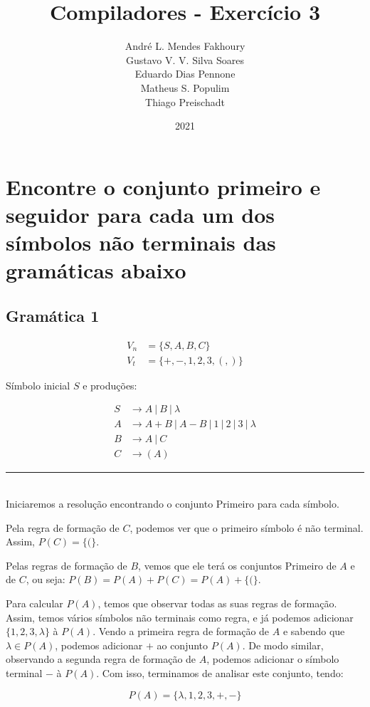 \documentclass{article}
\title{Compiladores - Exercício 3}
\author{André L. Mendes Fakhoury\\
Gustavo V. V. Silva Soares\\
Eduardo Dias Pennone\\
Matheus S. Populim\\
Thiago Preischadt\\
}
\date{2021}
\begin{document}
\maketitle

\section{Encontre o conjunto primeiro e seguidor para cada um dos símbolos não terminais das gramáticas abaixo}

\subsection{Gramática 1}

\begin{align*}
    V_n &= \{S, A, B, C\}\\
    V_t &= \{+,-,1,2,3,(,)\}
\end{align*}

\noindent Símbolo inicial $S$ e produções:

\begin{align*}
    S &\rightarrow A\ |\ B\ |\ \lambda\\
    A &\rightarrow A+B\ |\ A-B\ |\ 1\ |\ 2\ |\ 3\ |\ \lambda\\
    B &\rightarrow A\ |\ C\\
    C &\rightarrow (A)
\end{align*}

\noindent\rule{0.95 \textwidth}{1.pt}\\

Iniciaremos a resolução encontrando o conjunto Primeiro para cada símbolo.

Pela regra de formação de $C$, podemos ver que o primeiro símbolo é não terminal. Assim, $P(C) = \{(\}$.

Pelas regras de formação de $B$, vemos que ele terá os conjuntos Primeiro de $A$ e de $C$, ou seja: $P(B) = P(A) + P(C) = P(A) + \{(\}$.

Para calcular $P(A)$, temos que observar todas as suas regras de formação. Assim, temos vários símbolos não terminais como regra, e já podemos adicionar $\{1, 2, 3, \lambda\}$ à $P(A)$. Vendo a primeira regra de formação de $A$ e sabendo que $\lambda \in P(A)$, podemos adicionar $+$ ao conjunto $P(A)$. De modo similar, observando a segunda regra de formação de $A$, podemos adicionar o símbolo terminal $-$ à $P(A)$. Com isso, terminamos de analisar este conjunto, tendo:

$$P(A) = \{\lambda, 1, 2, 3, +, -\}$$
\end{document}

